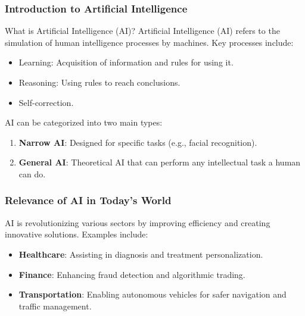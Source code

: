 \documentclass[aspectratio=169]{beamer}
\begin{document}
\frame{\titlepage}

\begin{frame}[fragile]
    \frametitle{Introduction to Artificial Intelligence}
    \begin{block}{What is Artificial Intelligence (AI)?}
        Artificial Intelligence (AI) refers to the simulation of human intelligence processes by machines. Key processes include:
        \begin{itemize}
            \item Learning: Acquisition of information and rules for using it.
            \item Reasoning: Using rules to reach conclusions.
            \item Self-correction.
        \end{itemize}
        AI can be categorized into two main types:
        \begin{enumerate}
            \item \textbf{Narrow AI}: Designed for specific tasks (e.g., facial recognition).
            \item \textbf{General AI}: Theoretical AI that can perform any intellectual task a human can do.
        \end{enumerate}
    \end{block}
\end{frame}

\begin{frame}[fragile]
    \frametitle{Relevance of AI in Today's World}
    AI is revolutionizing various sectors by improving efficiency and creating innovative solutions. Examples include:
    \begin{itemize}
        \item \textbf{Healthcare}: Assisting in diagnosis and treatment personalization.
        \item \textbf{Finance}: Enhancing fraud detection and algorithmic trading.
        \item \textbf{Transportation}: Enabling autonomous vehicles for safer navigation and traffic management.
    \end{itemize}
\end{frame}
\end{document}
